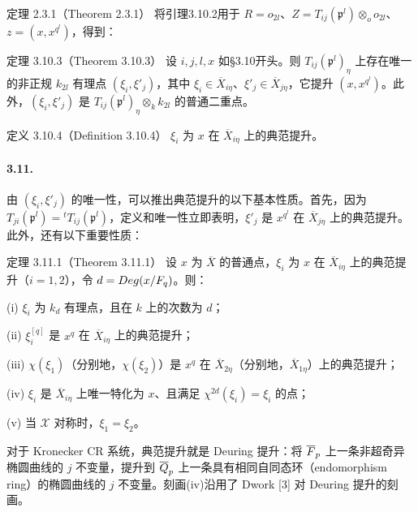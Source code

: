 \begin{originaltheorem}{定理 2.3.1（Theorem 2.3.1）}
将引理3.10.2用于 $R=o_{2l}$、$Z=T_{ij}(\mathfrak p^l)\otimes_oo_{2l}$、$z=(x,x^{q^l})$，得到：
\begin{originaltheorem}{定理 3.10.3（Theorem 3.10.3）}
设 $i,j,l,x$ 如§3.10开头。则 $T_{ij}(\mathfrak p^l)_\eta$ 上存在唯一的非正规 $k_{2l}$ 有理点 $(\xi_i,\xi'_j)$，其中 $\xi_i\in\overline X_{i\eta}$、$\xi'_j\in\overline X_{j\eta}$，它提升 $(x,x^{q^l})$。此外，$(\xi_i,\xi'_j)$ 是 $T_{ij}(\mathfrak p^l)_\eta\otimes_kk_{2l}$ 的普通二重点。
\end{originaltheorem}
\begin{originaltheorem}{定义 3.10.4（Definition 3.10.4）}
$\xi_i$ 为 $x$ 在 $\overline X_{i\eta}$ 上的典范提升。
\end{originaltheorem}

\paragraph*{3.11.}
由 $(\xi_i,\xi'_j)$ 的唯一性，可以推出典范提升的以下基本性质。首先，因为 $T_{ji}(\mathfrak p^l)={}^tT_{ij}(\mathfrak p^l)$，定义和唯一性立即表明，$\xi'_j$ 是 $x^{q^l}$ 在 $\overline X_{j\eta}$ 上的典范提升。此外，还有以下重要性质：
\begin{originaltheorem}{定理 3.11.1（Theorem 3.11.1）}
设 $x$ 为 $\overline X$ 的普通点，$\xi_i$ 为 $x$ 在 $\overline X_{i\eta}$ 上的典范提升（$i=1,2$），令 $d=Deg(x/F_q)$。则：

(i) $\xi_i$ 为 $k_d$ 有理点，且在 $k$ 上的次数为 $d$；

(ii) $\xi_i^{[q]}$ 是 $x^q$ 在 $\overline X_{i\eta}$ 上的典范提升；

(iii) $\chi(\xi_1)$（分别地，$\chi(\xi_2)$）是 $x^q$ 在 $\overline X_{2\eta}$（分别地，$\overline X_{1\eta}$）上的典范提升；

(iv) $\xi_i$ 是 $\overline X_{i\eta}$ 上唯一特化为 $x$、且满足 $\chi^{2d}(\xi_i)=\xi_i$ 的点；

(v) 当 $\mathcal X$ 对称时，$\xi_1=\xi_2$。
\end{originaltheorem}

对于 Kronecker CR 系统，典范提升就是 Deuring 提升：将 $\overline{F}_p$ 上一条非超奇异椭圆曲线的 $j$ 不变量，提升到 $\overline{Q}_p$ 上一条具有相同自同态环（endomorphism ring）的椭圆曲线的 $j$ 不变量。刻画(iv)沿用了 Dwork [3] 对 Deuring 提升的刻画。


\end{originaltheorem}
